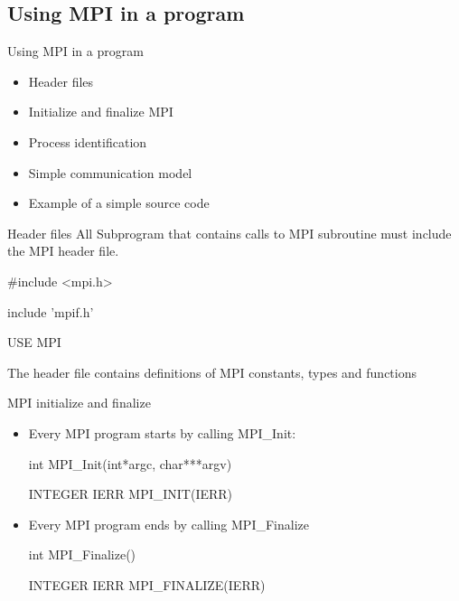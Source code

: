 \documentclass[aspectratio=43]{beamer}
\begin{document}
\subsection{Using MPI in a program}
\begin{frame}{Using MPI in a program}
\begin{itemize}
\item Header files
\item Initialize and finalize MPI
\item Process identification
\item Simple communication model
\item Example of a simple source code
\end{itemize}
\end{frame}

\begin{frame}[fragile]{Header files}
All Subprogram that contains calls to MPI subroutine must include the MPI header file.\\
\begin{Cpplisting}[]{}
#include <mpi.h>
\end{Cpplisting}
\begin{Fortranlisting}[77]{}
include 'mpif.h'
\end{Fortranlisting}
\begin{Fortranlisting}[90]{}
USE MPI
\end{Fortranlisting}
The header file contains definitions of MPI constants, types and functions
\end{frame}


\begin{frame}[fragile]{MPI initialize and finalize}
\begin{itemize}
    \item Every MPI program starts by calling MPI\_Init:\\
\begin{Cpplisting}[]{}
int MPI_Init(int*argc, char***argv)
\end{Cpplisting}
\begin{Fortranlisting}[]{}
INTEGER IERR
MPI_INIT(IERR)
\end{Fortranlisting}
    \item Every MPI program ends by calling MPI\_Finalize\\
\begin{Cpplisting}[]{}
int MPI_Finalize()
\end{Cpplisting}
\begin{Fortranlisting}[]{}
INTEGER IERR
MPI_FINALIZE(IERR)
\end{Fortranlisting}
\end{itemize}
\end{frame}
\end{document}
